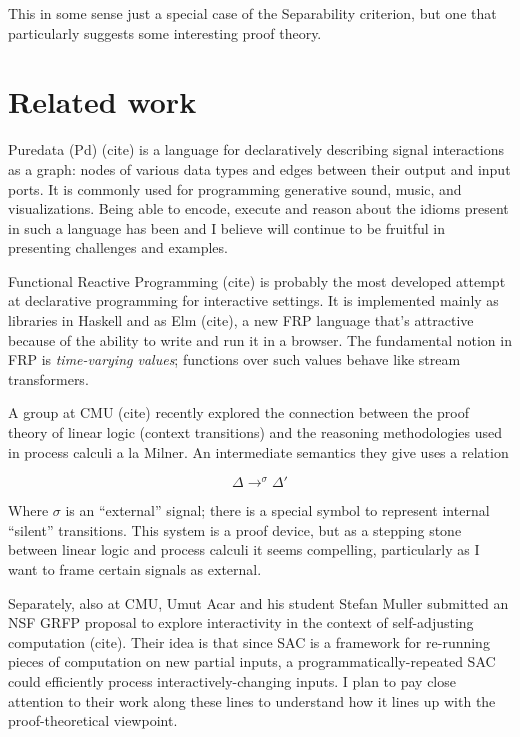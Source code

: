 \documentclass{article}
\begin{document}
This in some sense just a special case of the Separability
criterion, but one that particularly suggests some interesting proof
theory.


\section{Related work}

Puredata (Pd) (cite) is a language for declaratively describing signal
interactions as a graph: nodes of various data types and edges between
their output and input ports. It is commonly used for programming
generative sound, music, and visualizations. Being able to encode, execute
and reason about the idioms present in such a language has been and I
believe will continue to be fruitful in presenting challenges and examples.

Functional Reactive Programming (cite) is probably the most developed attempt at 
declarative programming for interactive settings. It is implemented mainly
as libraries in Haskell and as Elm (cite), a new FRP language that's
attractive because of the ability to write and run it in a browser. The
fundamental notion in FRP is {\em time-varying values}; functions over such
values behave like stream transformers.

A group at CMU (cite) recently explored the connection between the proof
theory of linear logic (context transitions) and the reasoning
methodologies used in process calculi a la Milner. An intermediate
semantics they give uses a relation

\[
\Delta \longrightarrow^{\sigma} \Delta'
\]

Where $\sigma$ is an ``external'' signal; there is a special symbol to
represent internal ``silent'' transitions. This system is a proof device,
but as a stepping stone between linear logic and process calculi it seems
compelling, particularly as I want to frame certain signals as external.



Separately, also at CMU, Umut Acar and his student Stefan Muller submitted
an NSF GRFP proposal to explore interactivity in the context of
self-adjusting computation (cite). Their idea is that since SAC is a
framework for re-running pieces of computation on new partial inputs, a
programmatically-repeated SAC could efficiently process
interactively-changing inputs. I plan to pay close attention to their work
along these lines to understand how it lines up with the proof-theoretical
viewpoint.
\end{document}

